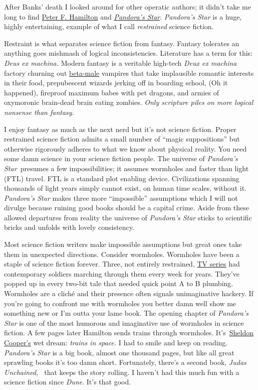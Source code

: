 After Banks' death I looked around for other operatic authors; it didn't
take me long to find \href{http://www.peterfhamilton.co.uk/}{Peter F.
Hamilton} and
\href{http://www.barnesandnoble.com/w/pandoras-star-peter-f-hamilton/1100293432?ean=9780345479211}{\emph{Pandora's
Star}}. \emph{Pandora's Star} is a huge, highly entertaining, example of
what I call \emph{restrained} science fiction.

Restraint is what separates science fiction from fantasy. Fantasy
tolerates an anything goes mishmash of logical inconsistencies.
Literature has a term for this: \emph{Deus ex machina.} Modern fantasy is
a veritable high-tech \emph{Deux ex machina} factory churning out
\href{http://theredpillroom.blogspot.com/p/masculexicon.html}{beta-male}
vampires that take implausible romantic interests in their food,
prepubescent wizards jerking off in boarding school, (Oh it happened),
fireproof maximum babes with pet dragons, and armies of oxymoronic
brain-dead brain eating zombies. \emph{Only scripture piles on more
logical nonsense than fantasy.}

I enjoy fantasy as much as the next nerd but it's not science fiction.
Proper restrained science fiction admits a small number of ``magic
suppositions'' but otherwise rigorously adheres to what we know about
physical reality. You need some damn science in your science fiction
people. The universe of \emph{Pandora's Star~}presumes a few
impossibilities; it assumes wormholes and faster than light (FTL)
travel. FTL is a standard plot enabling device. Civilizations spanning
thousands of light years simply cannot exist, on human time scales,
without it. \emph{Pandora's Star} makes three more ``impossible''
assumptions which I will not divulge because ruining good books should
be a capital crime. Aside from these allowed departures from reality the
universe of \emph{Pandora's Star} sticks to scientific bricks and unfolds
with lovely consistency.

Most science fiction writers make impossible assumptions but great ones
take them in unexpected directions. Consider wormholes. Wormholes have
been a staple of science fiction forever. Three, not entirely
restrained, \href{http://stargate.mgm.com/}{TV series} had contemporary
soldiers marching through them every week for years. They've popped up
in every two-bit tale that needed quick point A to B plumbing. Wormholes
are a cliché and their presence often signals unimaginative hackery. If
you're going to confront me with wormholes you better damn well show me
something new or I'm outta your lame book. The opening chapter of
\emph{Pandora's Star} is one of the most humorous and imaginative use of
wormholes in science fiction. A few pages later Hamilton sends trains
through wormholes.
It's~\href{http://www.cbs.com/shows/big\_bang\_theory/}{Sheldon
Cooper's} wet dream: \emph{trains in space.} I had to smile and keep on
reading. \emph{Pandora's Star} is a big book, almost one thousand pages,
but like all great sprawling books it's too damn short. Fortunately,
there's a second book, \emph{Judas Unchained,~} that keeps the story
rolling. I haven't had this much fun with a science fiction since
\emph{Dune}. It's that good.

